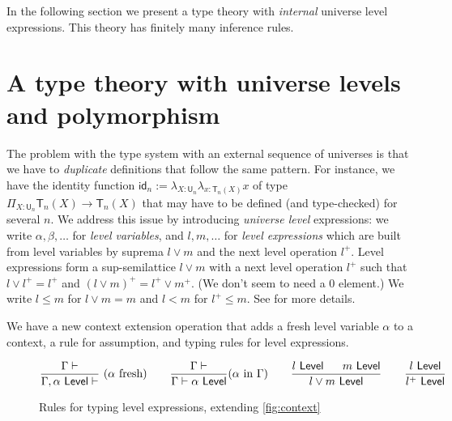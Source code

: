 \documentclass[11pt,a4paper]{article}
\theoremstyle{definition}
\newcommand{\id}{\mathsf{id}}
\newcommand{\UU}{\mathsf{U}}
\newcommand{\Level}{\mathsf{Level}}
\newcommand{\mypi}[3]{\Pi_{#1:#2}#3}
\newcommand{\mylam}[3]{\lambda_{#1:#2}#3}
\newcommand{\T}{\mathsf{T}}
\begin{document}
In the following section we present a type theory with \emph{internal}
universe level expressions. This theory has finitely many inference rules.

 \section{A type theory with universe levels and polymorphism }\label{sec:internal}


The problem with the type system with an external sequence of universes
is that we have to \emph{duplicate} definitions that follow
the same pattern. For instance, we have the identity function
$\id_n := \mylam{X}{\UU_n}{\mylam{x}{\T_n(X)}{x}}$
of type $\mypi{X}{\UU_n}{\T_n(X)\rightarrow \T_n(X)}$ that
may have to be defined (and type-checked) for several $n$.
We address this issue by introducing \emph{universe level}
expressions: we write $\alpha,\beta,\dots$
for \emph{level variables}, and $l,m,\dots$ for
\emph{level expressions} which are built from level variables
by suprema $l \vee m$ and the next level operation $l^+$.
Level expressions form a sup-semilattice $l\vee m$
with a next level operation $l^+$ such that $l \vee l^+ = l^+$
and $(l\vee m)^+ = l^+\vee m^+$. (We don't seem to need a $0$ element.)
We write $l\leqslant m$ for $l\vee m = m$ and $l<m$ for $l^+\leqslant m$.
See \cite{bezem-coquand:lattices} for more details.


We have a new context extension operation that adds a fresh level variable
$\alpha$ to a context, a rule for assumption, and typing rules
for level expressions.

\begin{figure}[H]
  \caption{Rules for typing level expressions, extending
  \cref{fig:context}}\label{fig:contextL}
$$
\frac{\Gamma\vdash}{\Gamma,\alpha~\Level\vdash}~(\alpha~\text{fresh})~~~~~~
\frac{\Gamma\vdash}{\Gamma\vdash\alpha~\Level}(\alpha~\text{in}~\Gamma)~~~~~~
\frac{l~\Level~~~~~m~\Level}{l\vee m~\Level}~~~~~~
\frac{l~\Level}{l^+~\Level}
\belowdisplayshortskip 0pt
$$
\end{figure}
\end{document}
